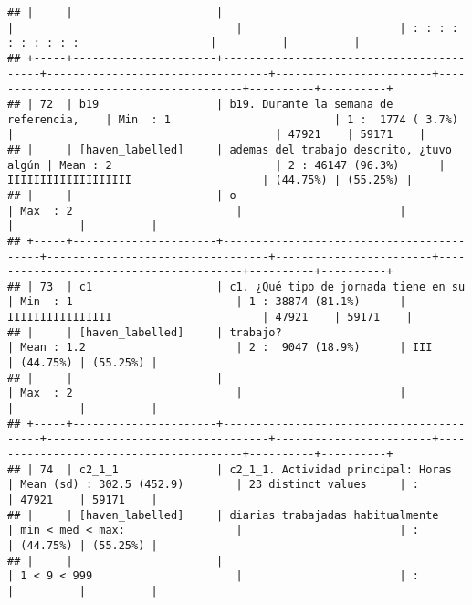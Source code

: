 \documentclass[]{article}
\begin{document}
\begin{verbatim}
## |     |                      |                                          |                                  |                        | : : : : : : : : : :                    |          |          |
## +-----+----------------------+------------------------------------------+----------------------------------+------------------------+----------------------------------------+----------+----------+
## | 72  | b19                  | b19. Durante la semana de referencia,    | Min  : 1                         | 1 :  1774 ( 3.7%)      |                                        | 47921    | 59171    |
## |     | [haven_labelled]     | ademas del trabajo descrito, ¿tuvo algún | Mean : 2                         | 2 : 46147 (96.3%)      | IIIIIIIIIIIIIIIIIII                    | (44.75%) | (55.25%) |
## |     |                      | o                                        | Max  : 2                         |                        |                                        |          |          |
## +-----+----------------------+------------------------------------------+----------------------------------+------------------------+----------------------------------------+----------+----------+
## | 73  | c1                   | c1. ¿Qué tipo de jornada tiene en su     | Min  : 1                         | 1 : 38874 (81.1%)      | IIIIIIIIIIIIIIII                       | 47921    | 59171    |
## |     | [haven_labelled]     | trabajo?                                 | Mean : 1.2                       | 2 :  9047 (18.9%)      | III                                    | (44.75%) | (55.25%) |
## |     |                      |                                          | Max  : 2                         |                        |                                        |          |          |
## +-----+----------------------+------------------------------------------+----------------------------------+------------------------+----------------------------------------+----------+----------+
## | 74  | c2_1_1               | c2_1_1. Actividad principal: Horas       | Mean (sd) : 302.5 (452.9)        | 23 distinct values     | :                                      | 47921    | 59171    |
## |     | [haven_labelled]     | diarias trabajadas habitualmente         | min < med < max:                 |                        | :                                      | (44.75%) | (55.25%) |
## |     |                      |                                          | 1 < 9 < 999                      |                        | :                                      |          |          |

\end{verbatim}
\end{document}

